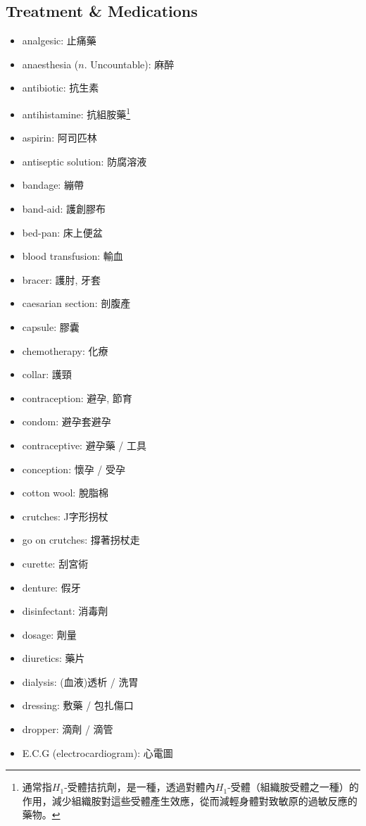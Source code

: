 \subsection{Treatment \& Medications}
\begin{multicols}{2}
\begin{itemize}
  \itemsep0em
  \item analgesic: 止痛藥
  \item anaesthesia ($n.$ Uncountable): 麻醉
  \item antibiotic: 抗生素
  \item antihistamine: 抗組胺藥\footnote{通常指$H_1$-受體拮抗劑，是一種，透過對體內$H_1$-受體（組織胺受體之一種）的作用，減少組織胺對這些受體產生效應，從而減輕身體對致敏原的過敏反應的藥物。}
  \item aspirin: 阿司匹林
  \item antiseptic solution: 防腐溶液
  \item bandage: 繃帶
  \item band-aid: 護創膠布
  \item bed-pan: 床上便盆
  \item blood transfusion: 輸血
  \item bracer: 護肘, 牙套
  \item caesarian section: 剖腹產
  \item capsule: 膠囊
  \item chemotherapy: 化療
  \item collar: 護頸
  \item contraception: 避孕, 節育
  \item condom: 避孕套避孕
  \item contraceptive: 避孕藥 / 工具
  \item conception: 懷孕 / 受孕
  \item cotton wool: 脫脂棉
  \item crutches: J字形拐杖
  \item go on crutches: 撐著拐杖走
  \item curette: 刮宮術
  \item denture: 假牙
  \item disinfectant: 消毒劑
  \item dosage: 劑量
  \item diuretics: 藥片
  \item dialysis: (血液)透析 / 洗胃
  \item dressing: 敷藥 / 包扎傷口
  \item dropper: 滴劑 / 滴管
  \item E.C.G (electrocardiogram): 心電圖

\end{itemize}
\end{multicols}
